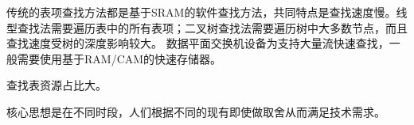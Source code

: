 传统的表项查找方法都是基于SRAM的软件查找方法，共同特点是查找速度慢。线型查找法需要遍历表中的所有表项；二叉树查找法需要遍历树中大多数节点，而且查找速度受树的深度影响较大。
数据平面交换机设备为支持大量流快速查找，一般需要使用基于RAM/CAM的快速存储器。

查找表资源占比大。




核心思想是在不同时段，人们根据不同的现有即使做取舍从而满足技术需求。











































